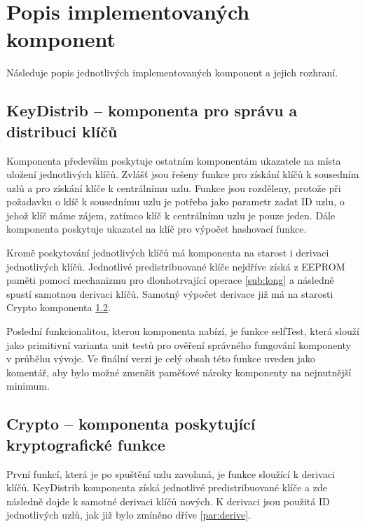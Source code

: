 \documentclass[11pt,final,twoside]{fithesis2}
\begin{document}
\section{Popis implementovaných komponent}
Následuje popis jednotlivých implementovaných komponent a jejich rozhraní. 
\subsection{KeyDistrib -- komponenta pro správu a distribuci klíčů}

Komponenta především poskytuje ostatním komponentám ukazatele na místa uložení jednotlivých klíčů. Zvlášť jsou řešeny funkce pro získání klíčů k sousedním uzlů a pro získání klíče k centrálnímu uzlu. 
Funkce jsou rozděleny, protože při požadavku o klíč k sousednímu uzlu je potřeba jako parametr zadat ID uzlu, o jehož klíč máme zájem, zatímco klíč k centrálnímu uzlu je pouze jeden. Dále komponenta 
poskytuje ukazatel na klíč pro výpočet hashovací funkce.

Kromě poskytování jednotlivých klíčů má komponenta na starost i derivaci jednotlivých klíčů. Jednotlivé predistribuované klíče nejdříve získá z EEPROM paměti pomocí mechanizmu pro dlouhotrvající operace 
\ref{sub:long} a následně spustí samotnou derivaci klíčů. Samotný výpočet derivace již má na starosti Crypto komponenta \ref{sub:crypto}. 

Poslední funkcionalitou, kterou komponenta nabízí, je funkce selfTest, která slouží jako primitivní varianta unit testů pro ověření správného fungování komponenty v průběhu vývoje. Ve finální verzi je
celý obsah této funkce uveden jako komentář, aby bylo možné zmenšit paměťové nároky komponenty na nejnutnější minimum. 

\subsection{Crypto -- komponenta poskytující kryptografické funkce} \label{sub:crypto}

První funkcí, která je po spuštění uzlu zavolaná, je funkce sloužící k derivaci klíčů. KeyDistrib komponenta získá jednotlivé predistribuované klíče a zde následně dojde 
k samotné derivaci klíčů nových. K derivaci jsou použitá ID jednotlivých uzlů, jak již bylo zmíněno dříve \ref{par:derive}.
\end{document}
